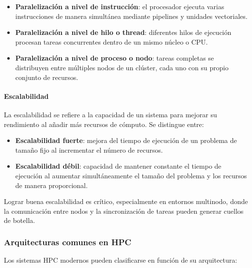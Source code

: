 \begin{itemize}
    \item \textbf{Paralelización a nivel de instrucción}: el procesador ejecuta varias instrucciones de manera simultánea mediante pipelines y unidades vectoriales.
    \item \textbf{Paralelización a nivel de hilo o thread}: diferentes hilos de ejecución procesan tareas concurrentes dentro de un mismo núcleo o CPU.
    \item \textbf{Paralelización a nivel de proceso o nodo}: tareas completas se distribuyen entre múltiples nodos de un clúster, cada uno con su propio conjunto de recursos.
\end{itemize}
\paragraph{Escalabilidad}
La escalabilidad se refiere a la capacidad de un sistema para mejorar su rendimiento al añadir más recursos de cómputo. Se distingue entre:

\begin{itemize}
    \item \textbf{Escalabilidad fuerte}: mejora del tiempo de ejecución de un problema de tamaño fijo al incrementar el número de recursos.
    \item \textbf{Escalabilidad débil}: capacidad de mantener constante el tiempo de ejecución al aumentar simultáneamente el tamaño del problema y los recursos de manera proporcional.
\end{itemize}

Lograr buena escalabilidad es crítico, especialmente en entornos multinodo, donde la comunicación entre nodos y la sincronización de tareas pueden generar cuellos de botella.

\subsubsection{Arquitecturas comunes en \acs{HPC}}

Los sistemas \acs{HPC} modernos pueden clasificarse en función de su arquitectura:

